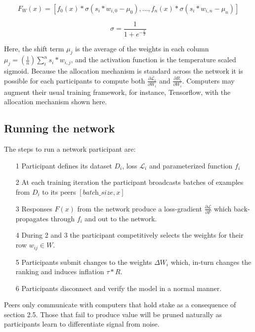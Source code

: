 \documentclass{article}
\begin{document}
\begin{equation}
F_W(x) =  [f_0(x) * \sigma(s_i * w_{i,0} - \mu_0),  ... , f_n(x) * \sigma(s_i * w_{i,n} - \mu_n)]
\end{equation}

\begin{equation}
\sigma =  \frac{1}{ 1 + e^{-\frac{x}{T}} }
\end{equation}

Here, the shift term $\mu_j$ is the average of the weights in each column $\mu_j = (\frac{1}{n}) \sum_{i}^{n}{s_i * w_{i,j}}$, and the activation function is the temperature scaled sigmoid. Because the allocation mechanism is standard across the network it is possible for each participants to compute both $\frac{\partial \mathcal{L}_i}{\partial W_i}$ and $\frac{\partial R_i}{\partial W_i}$. Computers may augment their usual training framework, for instance, Tensorflow, with the allocation mechanism shown here. 
\bigskip

\subsection{Running the network}

The steps to run a network participant are:
\begin{itemize}
	
	\item[1]  Participant defines its dataset $D_i$, loss $\mathcal{L}_i$ and parameterized function $f_i$
	\item[2]  At each training iteration the participant broadcasts batches of examples from $D_i$ to its peers $[\textit{batch\_size}, x]$
	\item[3]  Responses $F(x)$ from the network produce a loss-gradient $\frac{\partial \mathcal{L}}{\partial F}$ which back-propagates through $f_i$ and out to the network.
	\item[4]  During 2 and 3 the participant competitively selects the weights for their row $w_{ij} \in W$.
	\item[5]  Participants submit changes to the weights $\Delta W_i$ which, in-turn changes the ranking and induces inflation $\tau * R$.
	\item[6]  Participants disconnect and verify the model in a normal manner.
\end{itemize}

Peers only communicate with computers that hold stake as a consequence of section 2.5. Those that fail to produce value will be pruned naturally as participants learn to differentiate signal from noise.
\end{document}
